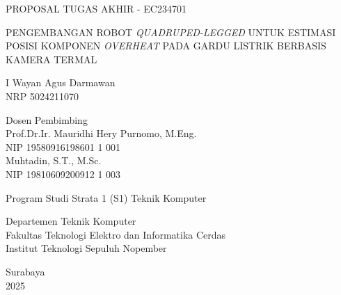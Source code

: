 \begin{large}
  PROPOSAL TUGAS AKHIR - EC234701
\end{large}

\vspace{\fill}

\begin{spacing}{1.5}
  \begin{Large}
    PENGEMBANGAN ROBOT \emph{QUADRUPED-LEGGED} UNTUK ESTIMASI POSISI KOMPONEN \emph{OVERHEAT} PADA GARDU LISTRIK BERBASIS KAMERA TERMAL
  \end{Large}
\end{spacing}

\vspace{\fill}

\begin{large}
  I Wayan Agus Darmawan \\
  \textmd{NRP 5024211070}
\end{large}

\vspace{\fill}

\begin{large}
  \textmd{Dosen Pembimbing} \\
  Prof.Dr.Ir. Mauridhi Hery Purnomo, M.Eng. \\
  \textmd{NIP 19580916198601 1 001} \\
  Muhtadin, S.T., M.Sc. \\
  \textmd{NIP 19810609200912 1 003} \\
\end{large}

\vspace{\fill}

Program Studi Strata 1 (S1) Teknik  Komputer\\

\mdseries

Departemen Teknik  Komputer \\
Fakultas Teknologi Elektro dan Informatika Cerdas \\
Institut Teknologi Sepuluh Nopember

Surabaya \\
2025
